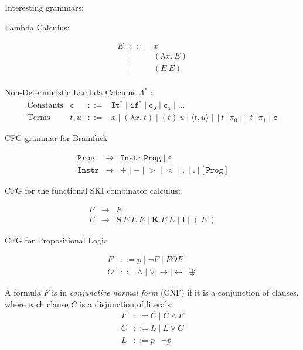 \documentclass{article}
\begin{document}
Interesting grammars:

Lambda Calculus:

\[
  \begin{array}{crl}
    E & ::= & x \\
      & \mid& (\lambda x.~E) \\
      & \mid& (E~E) \\
  \end{array}
\]

Non-Deterministic Lambda Calculus \(\Lambda^*\) \cite{AZ13}:
\[
  \begin{array}{lrrl}
   \text{Constants} & \mathtt{c}    & ::= & \mathtt{It^*} \mid \mathtt{if^*} \mid \mathtt{c_0} \mid \mathtt{c_1} \mid \dots \\
   \text{Terms}     & t, u & ::= & x \mid (\lambda x.~t) \mid (t)~u \mid \langle t, u \rangle \mid [t]\pi_0 \mid [t]\pi_1 \mid \mathtt{c}
  \end{array}
\]

CFG grammar for Brainfuck

\newcommand\Prog{\mathtt{Prog}}
\newcommand\Instr{\mathtt{Instr}}
\[
  \begin{array}{crl}
    \Prog  & \to & \Instr~\Prog \mid \varepsilon \\
    \Instr & \to & \mathtt{+} \mid \mathtt{-} \mid \mathtt{>} \mid \mathtt{<}
    \mid \mathtt{,} \mid \mathtt{.} \mid \mathtt{[}~\Prog~\mathtt{]}
\end{array}
\]

CFG for the functional SKI combinator calculus:

\[
  \begin{array}{crl}
  P & \to & E \\
  E & \to & \mathbf{S}~E~E~E \mid \mathbf{K}~E~E \mid \mathbf{I} \mid (~E~)
\end{array}
\]

CFG for Propositional Logic

\begin{align*}
  F &::= p \mid \neg F \mid F O F \\
  O &::= \land \mid \lor \mid \to \mid \leftrightarrow \mid \oplus
\end{align*}

A formula \(F\) is in \textit{conjunctive normal form} (CNF) if it is a
conjunction of clauses, where each clause \(C\) is a disjunction of literals:
\begin{align*}
  F &::= C \mid C \land F \\
  C &::= L \mid L \lor C \\
  L &::= p \mid \neg p
\end{align*}
\end{document}
